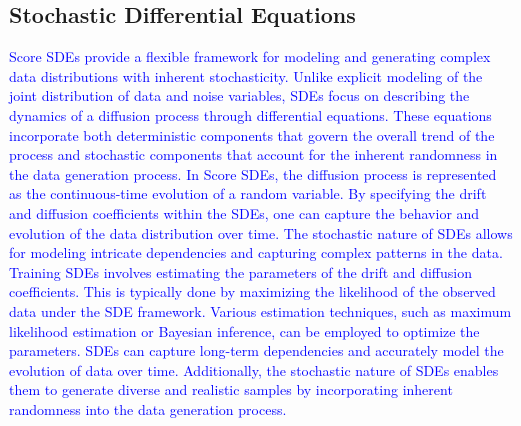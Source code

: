\subsection{Stochastic Differential Equations}
\textcolor{blue}{Score SDEs provide a flexible framework for modeling and generating complex data distributions with inherent stochasticity. Unlike explicit modeling of the joint distribution of data and noise variables, SDEs focus on describing the dynamics of a diffusion process through differential equations. These equations incorporate both deterministic components that govern the overall trend of the process and stochastic components that account for the inherent randomness in the data generation process.
In Score SDEs, the diffusion process is represented as the continuous-time evolution of a random variable. By specifying the drift and diffusion coefficients within the SDEs, one can capture the behavior and evolution of the data distribution over time. The stochastic nature of SDEs allows for modeling intricate dependencies and capturing complex patterns in the data.
Training SDEs involves estimating the parameters of the drift and diffusion coefficients. This is typically done by maximizing the likelihood of the observed data under the SDE framework. Various estimation techniques, such as maximum likelihood estimation or Bayesian inference, can be employed to optimize the parameters.
SDEs can capture long-term dependencies and accurately model the evolution of data over time. Additionally, the stochastic nature of SDEs enables them to generate diverse and realistic samples by incorporating inherent randomness into the data generation process.}

